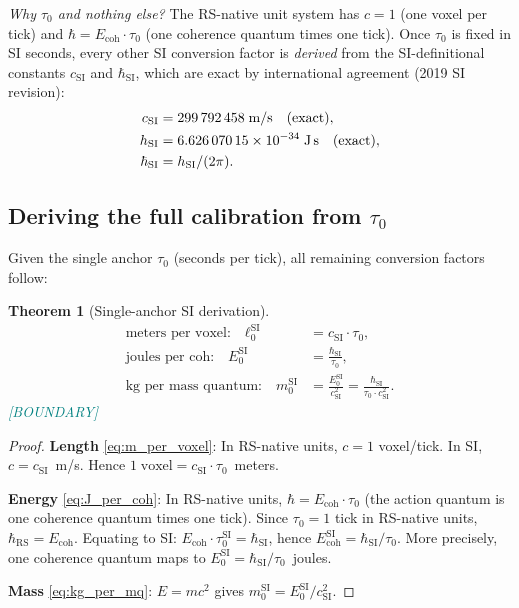 \documentclass[11pt,a4paper]{article}
\newtheorem{theorem}{Theorem}[section]
\theoremstyle{definition}
\theoremstyle{remark}
\newcommand{\Ecoh}{E_{\mathrm{coh}}}
\newcommand{\BOUNDARY}{\textcolor{teal}{\footnotesize\textsf{[BOUNDARY]}}}
\begin{document}
\noindent\textit{Why $\tau_0$ and nothing else?}\quad
The RS-native unit system has $c = 1$ (one voxel per tick) and
$\hbar = \Ecoh \cdot \tau_0$ (one coherence quantum times one tick).
Once $\tau_0$ is fixed in SI seconds, every other SI conversion factor
is \emph{derived} from the SI-definitional constants $c_{\mathrm{SI}}$ and
$\hbar_{\mathrm{SI}}$, which are exact by international agreement (2019 SI
revision):
\begin{align}
  c_{\mathrm{SI}} &= 299\,792\,458\;\text{m/s}
  \quad\text{(exact)}, \label{eq:c_SI} \\
  h_{\mathrm{SI}} &= 6.626\,070\,15 \times 10^{-34}\;\text{J\,s}
  \quad\text{(exact)}, \label{eq:h_SI} \\
  \hbar_{\mathrm{SI}} &= h_{\mathrm{SI}} / (2\pi).
  \label{eq:hbar_SI}
\end{align}

\subsection{Deriving the full calibration from $\tau_0$}

Given the single anchor $\tau_0$ (seconds per tick), all remaining conversion
factors follow:

\begin{theorem}[Single-anchor SI derivation]
\label{thm:SI_derivation}
\begin{align}
  \text{meters per voxel:}\quad
  \ell_0^{\mathrm{SI}} &= c_{\mathrm{SI}} \cdot \tau_0,
  \label{eq:m_per_voxel} \\[4pt]
  \text{joules per coh:}\quad
  E_0^{\mathrm{SI}} &= \frac{\hbar_{\mathrm{SI}}}{\tau_0},
  \label{eq:J_per_coh} \\[4pt]
  \text{kg per mass quantum:}\quad
  m_0^{\mathrm{SI}} &= \frac{E_0^{\mathrm{SI}}}{c_{\mathrm{SI}}^2}
  = \frac{\hbar_{\mathrm{SI}}}{\tau_0 \cdot c_{\mathrm{SI}}^2}.
  \label{eq:kg_per_mq}
\end{align}
\BOUNDARY{}
\end{theorem}

\begin{proof}
\textbf{Length} \eqref{eq:m_per_voxel}:\;
In RS-native units, $c = 1$ voxel/tick.  In SI, $c = c_{\mathrm{SI}}$~m/s.
Hence $1\;\text{voxel} = c_{\mathrm{SI}} \cdot \tau_0$~meters.

\textbf{Energy} \eqref{eq:J_per_coh}:\;
In RS-native units, $\hbar = \Ecoh \cdot \tau_0$ (the action quantum is one
coherence quantum times one tick).  Since $\tau_0 = 1$ tick in RS-native
units, $\hbar_{\mathrm{RS}} = \Ecoh$.  Equating to SI:
$\Ecoh \cdot \tau_0^{\mathrm{SI}} = \hbar_{\mathrm{SI}}$, hence
$\Ecoh^{\mathrm{SI}} = \hbar_{\mathrm{SI}} / \tau_0$.
More precisely, one coherence quantum maps to
$E_0^{\mathrm{SI}} = \hbar_{\mathrm{SI}} / \tau_0$~joules.

\textbf{Mass} \eqref{eq:kg_per_mq}:\;
$E = mc^2$ gives $m_0^{\mathrm{SI}} = E_0^{\mathrm{SI}} / c_{\mathrm{SI}}^2$.
\end{proof}
\end{document}
